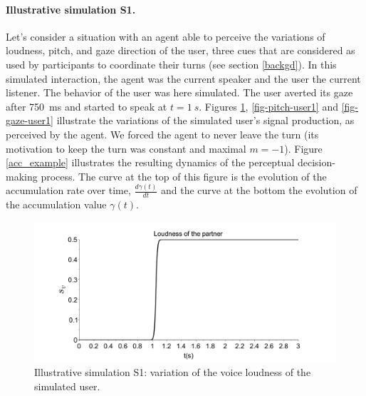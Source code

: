 \paragraph{Illustrative simulation S1.}%
Let's consider a situation with an agent able to perceive the variations of loudness, pitch, and gaze direction of the user, three cues that are considered as used by participants to coordinate their turns (see section \ref{backgd}). 
In this simulated interaction, the agent was the current speaker and the user the current listener. The behavior of the user was here simulated.
The user averted its gaze after 750~ms and started to speak at $t=1~s$. %
Figures \ref{fig-volume-user1}, \ref{fig-pitch-user1} and \ref{fig-gaze-user1} illustrate the variations of the simulated user's signal production, as perceived by the agent. 
We forced the agent to never leave the turn (its motivation to keep the turn was constant and maximal $m = -1$).
Figure \ref{acc_example} illustrates the resulting dynamics of the perceptual decision-making process. 
The curve at the top of this figure is the evolution of the accumulation rate over time, $\frac{d\gamma(t)}{dt}$ and the curve at the bottom the evolution of the accumulation value $\gamma(t)$. 



\begin{figure}
  \centering
  \includegraphics[width=\linewidth]{figure/loudness_simulated_partner.pdf}
  \caption{Illustrative simulation S1: variation of the voice loudness of the simulated user.}
  \label{fig-volume-user1}
\end{figure}

